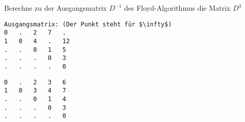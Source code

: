 ﻿\question[4]
Berechne zu der Ausgangsmatrix $D^{-1}$ des Floyd-Algorithmus
die Matrix $D^3$
\begin{lstlisting}
Ausgangsmatrix: (Der Punkt steht für $\infty$)
0   .   2   7   .
1   0   4   .   12
.   .   0   1   5
.   .   .   0   3
.   .   .   .   0
\end{lstlisting}

\begin{solutionbox}{6cm}
\begin{lstlisting}
0   .   2   3   6
1   0   3   4   7
.   .   0   1   4
.   .   .   0   3
.   .   .   .   0
\end{lstlisting}
\end{solutionbox}
